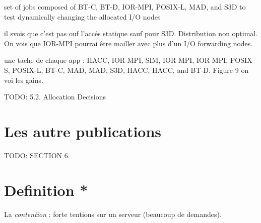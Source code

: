 \documentclass[10pt, a4paper]{article}
\begin{document}
set of jobs composed of BT-C, BT-D, IOR-MPI, POSIX-L, MAD, and S3D to test dynamically changing the allocated I/O nodes

il svois que c'est pas ouf l'accés statique sauf pour S3D. Distribution non optimal. On vois que IOR-MPI pourrai être mailler avec plus d'un I/O forwarding nodes.

une tache de chaque app : HACC, IOR-MPI, SIM, IOR-MPI, IOR-MPI, POSIX-S, POSIX-L, BT-C, MAD, MAD, S3D, HACC, HACC, and BT-D. Figure 9 on voi les gains.



TODO: 5.2. Allocation Decisions


\section{Les autre publications}

TODO: SECTION 6.

\section{Definition *}

La \emph{contention} : forte tentions sur un serveur (beaucoup de demandes).
\end{document}
